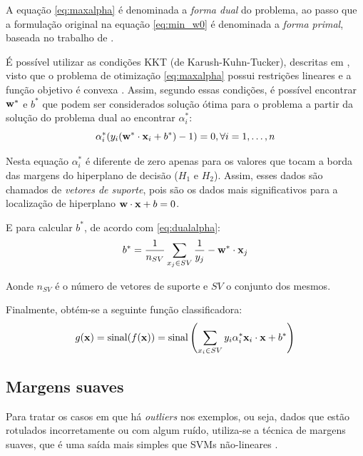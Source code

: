 A equação \ref{eq:maxalpha} é denominada a \emph{forma dual} do problema, ao passo que a formulação original na equação \ref{eq:min_w0} é denominada a \emph{forma primal}, baseada no trabalho de .

É possível utilizar as condições KKT (de Karush-Kuhn-Tucker), descritas em , visto que o problema de otimização \ref{eq:maxalpha} possui restrições lineares e a função objetivo é convexa \cite{burges1998tutorial}. Assim, segundo essas condições, é possível encontrar $\mathbf{w^*}$ e $b^*$ que podem ser considerados solução ótima para o problema a partir da solução do problema dual ao encontrar $\alpha_i^*$:
\begin{equation}\label{eq:dualalpha}
  \alpha_i^*(y_i(\mathbf{w^*}\cdot\mathbf{x}_i+b^*) - 1) = 0, \forall{i}=1,\dotsc,n
\end{equation}

Nesta equação $\alpha_i^*$ é diferente de zero apenas para os valores que tocam a borda das margens do hiperplano de decisão ($H_1$ e $H_2$). Assim, esses dados são chamados de \emph{vetores de suporte}, pois são os dados mais significativos para a localização de hiperplano $\mathbf{w}\cdot\mathbf{x} + b = 0$.

E para calcular $b^*$, de acordo com \ref{eq:dualalpha}:
\begin{equation}\nonumber
  b^* = \frac{1}{n_{SV}}\sum_{x_j \in SV}{\frac{1}{y_j} - \mathbf{w^*}\cdot\mathbf{x}_j}
\end{equation}

Aonde $n_{SV}$ é o número de vetores de suporte e $SV$ o conjunto dos mesmos.

Finalmente, obtém-se a seguinte função classificadora:
\begin{equation}\label{eq:classificadora}
  g(\mathbf{x}) = \operatorname{sinal}(f(\mathbf{x}))
              = \operatorname{sinal}\left(
                  \sum_{x_i \in SV}{y_i\alpha_i^*\mathbf{x}_i\cdot\mathbf{x}+b^*}
                \right)
\end{equation}

\subsection{Margens suaves}


Para tratar os casos em que há \emph{outliers} nos exemplos, ou seja, dados que estão rotulados incorretamente ou com algum ruído, utiliza-se a técnica de margens suaves, que é uma saída mais simples que SVMs não-lineares \cite{burges1998tutorial}.

